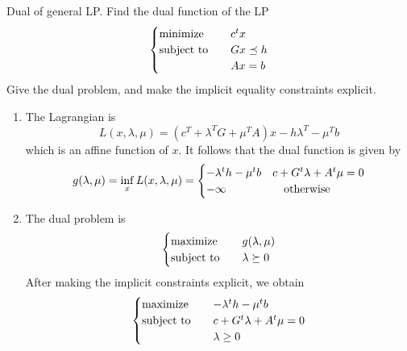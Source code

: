 \begin{problem}[5.5]
    Dual of general LP. Find the dual function of the LP\[\begin{cases}
        \operatorname{minimize} \quad &c^tx\\
        \operatorname{subject\ to} \quad &Gx \preceq h\\
        &Ax = b
    \end{cases}\] Give the dual problem, and make the implicit equality constraints explicit.
    \Answer \text{}\begin{enumerate}
        \item The Lagrangian is \[L(x, \lambda, \mu) = \left(c^{T}+\lambda^{T} G+\mu^{T} A\right) x-h \lambda^{T}-\mu^{T} b\] which is an affine function of $x$. It follows that the dual function is given by \[g(\lambda, \mu) = \inf_{x} L(x, \lambda, \mu) = \begin{cases}
            -\lambda^t h-\mu^t b & c+G^t \lambda+A^t \mu=0 \\
            -\infty & \qotherwise
        \end{cases}\]
        \item The dual problem is\[\begin{cases}
            \operatorname{maximize} \quad &g(\lambda, \mu)\\
            \operatorname{subject\ to} \quad &\lambda \succeq 0
        \end{cases}\]After making the implicit constraints explicit, we obtain\[\begin{cases}
            \operatorname{maximize} \quad &-\lambda^th - \mu^tb\\
            \operatorname{subject\ to} \quad &c + G^t\lambda + A^t\mu = 0\\
            &\lambda \ge 0
        \end{cases}\]
    \end{enumerate}
\end{problem}


